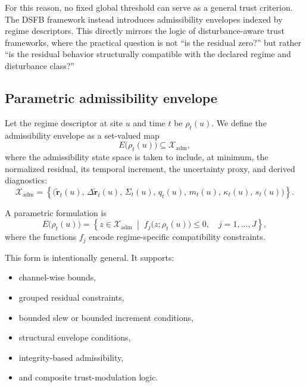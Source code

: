 \documentclass[11pt]{article}
\theoremstyle{definition}
\theoremstyle{plain}
\begin{document}
For this reason, no fixed global threshold can serve as a general trust criterion. The DSFB framework instead introduces admissibility envelopes indexed by regime descriptors. This directly mirrors the logic of disturbance-aware trust frameworks, where the practical question is not “is the residual zero?” but rather “is the residual behavior structurally compatible with the declared regime and disturbance class?” 


\subsection{Parametric admissibility envelope}

Let the regime descriptor at site $u$ and time $t$ be $\rho_t(u)$. We define the admissibility envelope as a set-valued map
\begin{equation}
E\bigl(\rho_t(u)\bigr)
\subseteq
\mathcal X_{\mathrm{adm}},
\end{equation}
where the admissibility state space is taken to include, at minimum, the normalized residual, its temporal increment, the uncertainty proxy, and derived diagnostics:
\begin{equation}
\mathcal X_{\mathrm{adm}}
=
\left\{
\bigl(
\tilde{\mathbf r}_t(u),\,
\Delta \tilde{\mathbf r}_t(u),\,
\Sigma_t(u),\,
q_t(u),\,
m_t(u),\,
\kappa_t(u),\,
s_t(u)
\bigr)
\right\}.
\end{equation}

A parametric formulation is
\begin{equation}
E\bigl(\rho_t(u)\bigr)
=
\left\{
z \in \mathcal X_{\mathrm{adm}}
\;\middle|\;
f_j\!\bigl(z;\rho_t(u)\bigr)\le 0,\quad j=1,\dots,J
\right\},
\end{equation}
where the functions $f_j$ encode regime-specific compatibility constraints.

This form is intentionally general. It supports:
\begin{itemize}[leftmargin=1.5em]
    \item channel-wise bounds,
    \item grouped residual constraints,
    \item bounded slew or bounded increment conditions,
    \item structural envelope conditions,
    \item integrity-based admissibility,
    \item and composite trust-modulation logic.
\end{itemize}
\end{document}
